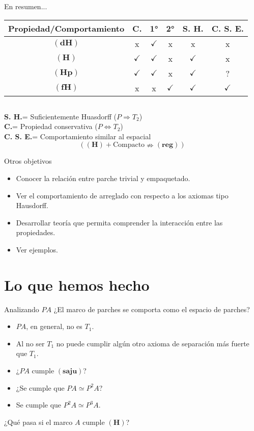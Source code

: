 \documentclass[compress,12pt]{beamer}
\begin{document}
\begin{frame}{En resumen...}
\begin{center}
\begin{tabular}{| c | c | c | c | c | c |}
\hline
 Propiedad/Comportamiento & \textbf{C.} & 1° & 2° & \textbf{S. H.} & \textbf{C. S. E.}\\ \hline
$\mathbf{(dH)}$ & x & $\checkmark$ & x & x & x \\ \hline
$\mathbf{(H)}$ & $\checkmark$ & $\checkmark$ & x & $\checkmark$ & x \\ \hline
$\mathbf{(Hp)}$ & $\checkmark$ & $\checkmark$ & x & $\checkmark$ & ? \\ \hline
$\mathbf{(fH)}$ & x & x &  $\checkmark$ & $\checkmark$ & $\checkmark$ \\ \hline
\end{tabular}
\end{center}
\begin{tiny}
$$\mbox{ }$$
\end{tiny}

\textbf{S. H.}= Suficientemente Huasdorff ($P\Rightarrow T_2$)\\
\textbf{C.}= Propiedad conservativa ($P\Leftrightarrow T_2$)\\
\textbf{C. S. E.}= Comportamiento similar al espacial
\[
(\mathbf{(H)}+\mbox{Compacto}\nRightarrow \mathbf{(reg)})
\]
\end{frame}

\begin{frame}{Otros objetivos}
    \begin{itemize}
        \item Conocer la relación entre parche trivial y empaquetado.
        \item Ver el comportamiento de arreglado con respecto a los axiomas tipo Hausdorff.
        \item Desarrollar teoría que permita comprender la interacción entre las propiedades.
        \item Ver ejemplos.
    \end{itemize}
\end{frame}

\section{Lo que hemos hecho}
\begin{frame}{Analizando $PA$}
¿El marco de parches se comporta como el espacio de parches?
\begin{itemize}
	\item $PA$, en general, no es  $T_1$.
	\item Al no ser $T_1$ no puede cumplir algún otro axioma de separación más fuerte que $T_1$.
	\item ¿$PA$ cumple $\mathbf{(saju)}$?
	\item ¿Se cumple que $PA\simeq P^2A$?
	\item Se cumple que $P^2A\simeq P^3A$.
\end{itemize}
¿Qué pasa si el marco $A$ cumple $\mathbf{(H)}$?
\end{frame}
\end{document}
